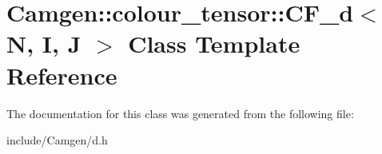 \hypertarget{a00028}{}\section{Camgen\+:\+:colour\+\_\+tensor\+:\+:C\+F\+\_\+d$<$ N, I, J $>$ Class Template Reference}
\label{a00028}


The documentation for this class was generated from the following file\+:\begin{DoxyCompactItemize}
\item 
include/\+Camgen/d.\+h\end{DoxyCompactItemize}
